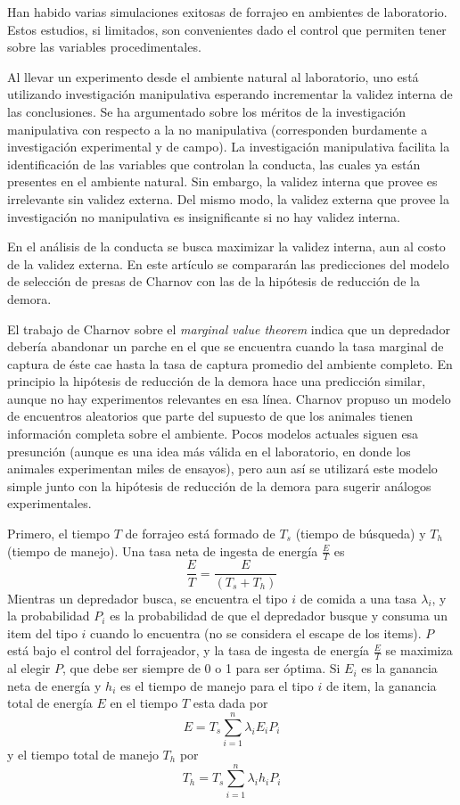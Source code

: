 \documentclass[a4paper,12pt]{article}
\begin{document}
Han habido varias simulaciones exitosas de forrajeo en ambientes de laboratorio. Estos estudios, si limitados, son convenientes dado el control que permiten tener sobre las variables procedimentales.

Al llevar un experimento desde el ambiente natural al laboratorio, uno está utilizando investigación manipulativa esperando incrementar la validez interna de las conclusiones. Se ha argumentado sobre los méritos de la investigación manipulativa con respecto a la no manipulativa (corresponden burdamente a investigación experimental y de campo). La investigación manipulativa facilita la identificación de las variables que controlan la conducta, las cuales ya están presentes en el ambiente natural. Sin embargo, la validez interna que provee es irrelevante sin validez externa. Del mismo modo, la validez externa que provee la investigación no manipulativa es insignificante si no hay validez interna.

En el análisis de la conducta se busca maximizar la validez interna, aun al costo de la validez externa. En este artículo se compararán las predicciones del modelo de selección de presas de Charnov con las de la hipótesis de reducción de la demora.

El trabajo de Charnov sobre el {\itshape marginal value theorem} indica que un depredador debería abandonar un parche en el que se encuentra cuando la tasa marginal de captura de éste cae hasta la tasa de captura promedio del ambiente completo. En principio la hipótesis de reducción de la demora hace una predicción similar, aunque no hay experimentos relevantes en esa línea. Charnov propuso un modelo de encuentros aleatorios que parte del supuesto de que los animales tienen información completa sobre el ambiente. Pocos modelos actuales siguen esa presunción (aunque es una idea más válida en el laboratorio, en donde los animales experimentan miles de ensayos), pero aun así se utilizará este modelo simple junto con la hipótesis de reducción de la demora para sugerir análogos experimentales.

Primero, el tiempo $T$ de forrajeo está formado de $T_s$ (tiempo de búsqueda) y $T_h$ (tiempo de manejo). Una tasa neta de ingesta de energía $\frac{E}{T}$ es
$$
\frac{E}{T} = \frac{E}{(T_s+T_h)}
$$
Mientras un depredador busca, se encuentra el tipo $i$ de comida a una tasa $\lambda_i$, y la probabilidad $P_i$ es la probabilidad de que el depredador busque y consuma un item del tipo $i$ cuando lo encuentra (no se considera el escape de los items). $P$ está bajo el control del forrajeador, y la tasa de ingesta de energía $\frac{E}{T}$ se maximiza al elegir $P$, que debe ser siempre de 0 o 1 para ser óptima. Si $E_i$ es la ganancia neta de energía y $h_i$ es el tiempo de manejo para el tipo $i$ de item, la ganancia total de energía $E$ en el tiempo $T$ esta dada por
$$
E=T_s\sum^n_{i=1}\lambda_i E_i P_i
$$
y el tiempo total de manejo $T_h$ por
$$
T_h = T_s \sum^n_{i=1} \lambda_i h_i P_i
$$
\end{document}
